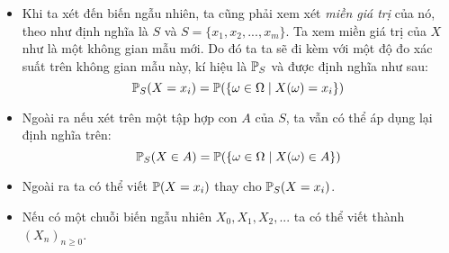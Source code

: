 \begin{itemize}





    \item Khi ta xét đến biến ngẫu nhiên, ta cũng phải xem xét \textit{miền giá trị} của nó, theo như định nghĩa là $S$ và $S = \{x_1, x_2, ..., x_m \}$. Ta xem miền giá trị của $X$ như là một không gian mẫu mới. Do đó ta ta sẽ đi kèm với một độ đo xác suất trên không gian mẫu này, kí hiệu là $\P_{S}$ và được định nghĩa như sau:
    $$
    \P_{S}(X = x_i) = \P(\{\omega \in \Omega \mid X(\omega) = x_i\})
    $$

    \item Ngoài ra nếu xét trên một tập hợp con $A$ của $S$, ta vẫn có thể áp dụng lại định nghĩa trên:
    $$
    \P_{S}(X \in A) = \P(\{\omega \in \Omega \mid X(\omega) \in A\})
    $$
    
    \item Ngoài ra ta có thể viết $\P(X = x_i)$ thay cho $\P_{S}(X = x_i)$.
    
    \item Nếu có một chuỗi biến ngẫu nhiên $X_0, X_1, X_2, ...$ ta có thể viết thành $(X_n)_{n \geq 0}$. 
\end{itemize}


